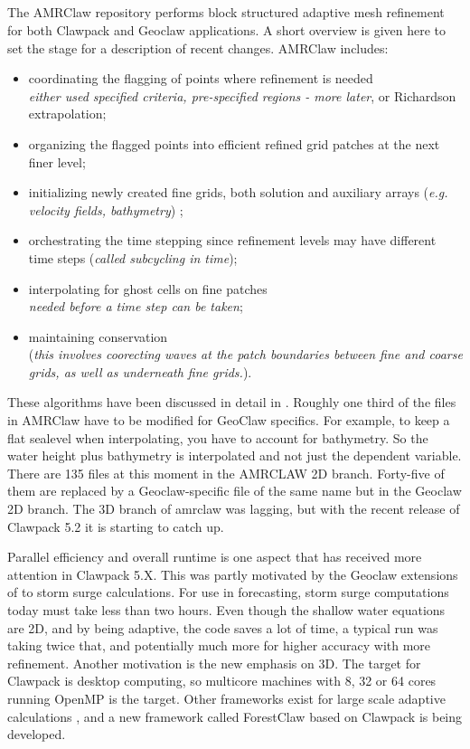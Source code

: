 %
%
%
\pagebreak
\subsection{\amrclaw}
The {AMRClaw} repository performs block structured adaptive mesh
refinement \cite{BO,BC} for both 
Clawpack and Geoclaw  applications.
A short overview is given
here to set the stage for a description of recent changes.
AMRClaw includes: 
\begin{itemize}
\item
coordinating the flagging of points where refinement is needed\\
{\em either used specified criteria, pre-specified regions - more
later}, or Richardson extrapolation;
\item
organizing the flagged points into efficient refined grid
patches at the next finer level;
\item
initializing newly created fine grids, both solution and
auxiliary arrays ({\em e.g. velocity fields, bathymetry}) ;
\item
orchestrating the time stepping since refinement levels may have
different time steps ({\em called subcycling in time});
\item
interpolating for ghost cells on fine patches \\
{\em needed before a time step can be taken};
\item
maintaining conservation\\
({\em this involves coorecting waves at
the patch boundaries between fine and coarse grids, as well as
underneath fine grids.}).
\end{itemize}

These algorithms have been discussed in detail in
\cite{BL,ActaNumerica}. Roughly one third of the files in AMRClaw
have to be modified for GeoClaw specifics. For example, to keep a flat
sealevel when interpolating, you have to account for bathymetry.
So the water height plus bathymetry is interpolated and not just the
dependent variable.  There are 135 files at this moment 
in the AMRCLAW 2D branch.
Forty-five of them are replaced by a Geoclaw-specific file of the
same name but in the Geoclaw 2D branch. The 3D branch of amrclaw
was lagging, but with the recent release of Clawpack 5.2 it is 
starting to catch up.

Parallel efficiency and overall runtime is one aspect that has 
received more attention in Clawpack 5.X. This was partly motivated
by the Geoclaw extensions of \cite{Mandli} to storm surge
calculations.  For use in forecasting, storm surge computations today
must take less than two hours. Even though the shallow water
equations are 2D, and by being adaptive, the code saves a lot
of time, a typical run was taking twice that, and potentially much more
for higher accuracy with more refinement. 
Another motivation is the new emphasis on 3D. The target for
Clawpack is desktop computing, so multicore machines with 8, 32 or
64 cores running OpenMP is the target.  Other frameworks exist
for large scale adaptive calculations \cite{BoxLib}, and a new
framework called ForestClaw \cite{DonnaCarlos} based on Clawpack
is being developed.

